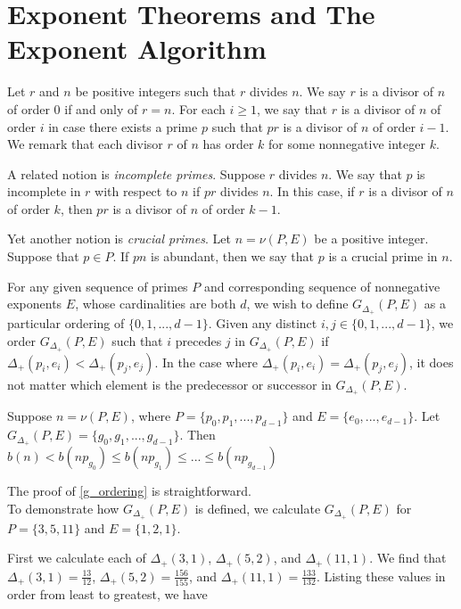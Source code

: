 \documentclass[../paper.tex]{subfiles}
\begin{document}
\section{Exponent Theorems and The Exponent Algorithm}

Let $r$ and $n$ be positive integers such that $r$ divides $n$. We
say $r$ is a divisor of $n$ of order $0$ if and only of $r = n$.
For each $i \geq 1$, we say that $r$ is a divisor of $n$ of order
$i$ in case there exists a prime $p$ such that $pr$ is a divisor
of $n$ of order $i - 1$. We remark that each divisor $r$ of $n$ has
order $k$ for some nonnegative integer $k$.

A related notion is \textit{incomplete primes}. Suppose $r$ divides 
$n$. We say that $p$ is incomplete in $r$ with respect to $n$ 
if $pr$ divides $n$. In this case, if $r$ is a divisor of $n$ of
order $k$, then $pr$ is a divisor of $n$ of order $k - 1$.

Yet another notion is \textit{crucial primes}. Let $n = \nu (P,E)$ 
be a positive integer. Suppose that $p \in P$. If $pn$ is
abundant, then we say that $p$ is a crucial prime in $n$. 

For any given sequence of primes $P$ and corresponding sequence of
nonnegative exponents $E$, whose cardinalities are both $d$, we
wish to define $G_{\Delta_+}(P,E)$ as a particular ordering of
$\{0, 1, ..., d-1\}$. Given any distinct $i,j \in \{0, 1, ..., 
d - 1\}$, we order $G_{\Delta_+}(P, E)$ such that $i$ precedes 
$j$ in $G_{\Delta_+}(P, E)$ if $\Delta_+(p_i, e_i) < 
\Delta_+(p_j, e_j)$. In the case where  $\Delta_+(p_i, e_i) =
\Delta_+(p_j, e_j)$, it does not matter which element is the
predecessor or successor in $G_{\Delta_+}(P,E)$.

\begin{theorem}\label{g_ordering}
Suppose $n = \nu(P, E)$, where $P = \{p_0, p_1, ..., p_{d-1}\}$
and $E = \{e_0, ..., e_{d-1}\}$. Let $G_{\Delta_+}(P,E) = \{g_0, 
g_1, ..., g_{d-1}\}$. Then $b(n) < b(n p_{g_0}) \leq b(n p_{g_1})
\leq ... \leq b(n p_{g_{d-1}})$
\end{theorem}

The proof of {\ref{g_ordering}} is straightforward.
\\

To demonstrate how $G_{\Delta_+}(P,E)$ is defined, we calculate
$G_{\Delta_+}(P,E)$ for $P = \{3, 5, 11\}$ and $E = \{1, 2, 1\}$.


First we calculate each of $\Delta_{+}(3,1)$, $\Delta_{+}(5,2)$, 
and $\Delta_{+}(11,1)$. We find that 
$\Delta_{+}(3,1) = \frac{13}{12}$,
$\Delta_{+}(5,2) = \frac{156}{155}$, and
$\Delta_{+}(11,1)= \frac{133}{132}$.
Listing these values in order from least to greatest, we have
\end{document}
